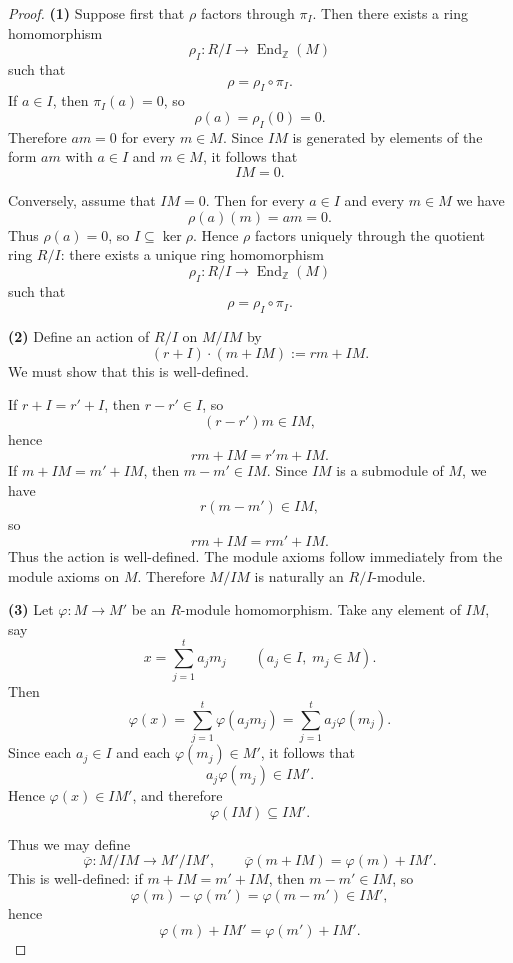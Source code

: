 \begin{proof}
    \textbf{(1)} Suppose first that $\rho$ factors through $\pi_I$. Then there exists a ring homomorphism
    \[
        \rho_I:R/I\to \operatorname{End}_{\mathbb{Z}}(M)
    \]
    such that
    \[
        \rho=\rho_I\circ \pi_I.
    \]
    If $a\in I$, then $\pi_I(a)=0$, so
    \[
        \rho(a)=\rho_I(0)=0.
    \]
    Therefore $am=0$ for every $m\in M$. Since $IM$ is generated by elements of the form $am$ with $a\in I$ and $m\in M$, it follows that
    \[
        IM=0.
    \]

    Conversely, assume that $IM=0$. Then for every $a\in I$ and every $m\in M$ we have
    \[
        \rho(a)(m)=am=0.
    \]
    Thus $\rho(a)=0$, so $I\subseteq \ker \rho$. Hence $\rho$ factors uniquely through the quotient ring $R/I$: there exists a unique ring homomorphism
    \[
        \rho_I:R/I\to \operatorname{End}_{\mathbb{Z}}(M)
    \]
    such that
    \[
        \rho=\rho_I\circ \pi_I.
    \]

    \textbf{(2)} Define an action of $R/I$ on $M/IM$ by
    \[
        (r+I)\cdot (m+IM):=rm+IM.
    \]
    We must show that this is well-defined.

    If $r+I=r'+I$, then $r-r'\in I$, so
    \[
        (r-r')m\in IM,
    \]
    hence
    \[
        rm+IM=r'm+IM.
    \]
    If $m+IM=m'+IM$, then $m-m'\in IM$. Since $IM$ is a submodule of $M$, we have
    \[
        r(m-m')\in IM,
    \]
    so
    \[
        rm+IM=rm'+IM.
    \]
    Thus the action is well-defined. The module axioms follow immediately from the module axioms on $M$. Therefore $M/IM$ is naturally an $R/I$-module.

    \textbf{(3)} Let $\varphi:M\to M'$ be an $R$-module homomorphism. Take any element of $IM$, say
    \[
        x=\sum_{j=1}^t a_j m_j
        \qquad (a_j\in I,\; m_j\in M).
    \]
    Then
    \[
        \varphi(x)=\sum_{j=1}^t \varphi(a_jm_j)=\sum_{j=1}^t a_j\varphi(m_j).
    \]
    Since each $a_j\in I$ and each $\varphi(m_j)\in M'$, it follows that
    \[
        a_j\varphi(m_j)\in IM'.
    \]
    Hence $\varphi(x)\in IM'$, and therefore
    \[
        \varphi(IM)\subseteq IM'.
    \]

    Thus we may define
    \[
        \overline{\varphi}:M/IM\to M'/IM',
        \qquad
        \overline{\varphi}(m+IM)=\varphi(m)+IM'.
    \]
    This is well-defined: if $m+IM=m'+IM$, then $m-m'\in IM$, so
    \[
        \varphi(m)-\varphi(m')=\varphi(m-m')\in IM',
    \]
    hence
    \[
        \varphi(m)+IM'=\varphi(m')+IM'.
    \]


\end{proof}
